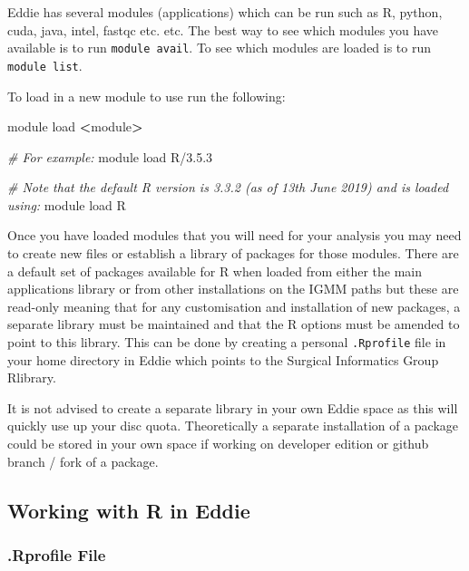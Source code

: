\documentclass[
]{book}
\newenvironment{Shaded}{\begin{snugshade}}{\end{snugshade}}
\newcommand{\CommentTok}[1]{\textcolor[rgb]{0.56,0.35,0.01}{\textit{#1}}}
\newcommand{\ExtensionTok}[1]{#1}
\newcommand{\NormalTok}[1]{#1}
\newcommand{\OperatorTok}[1]{\textcolor[rgb]{0.81,0.36,0.00}{\textbf{#1}}}
\begin{document}
Eddie has several modules (applications) which can be run such as R, python, cuda, java, intel, fastqc etc. etc. The best way to see which modules you have available is to run \texttt{module\ avail}. To see which modules are loaded is to run \texttt{module\ list}.

To load in a new module to use run the following:

\begin{Shaded}
\begin{Highlighting}[]
\ExtensionTok{module}\NormalTok{ load }\OperatorTok{\textless{}}\NormalTok{module}\OperatorTok{\textgreater{}}

\CommentTok{\# For example:}
\ExtensionTok{module}\NormalTok{ load R/3.5.3}

\CommentTok{\# Note that the default R version is 3.3.2 (as of 13th June 2019) and is loaded using:}
\ExtensionTok{module}\NormalTok{ load R}
\end{Highlighting}
\end{Shaded}

Once you have loaded modules that you will need for your analysis you may need to create new files or establish a library of packages for those modules. There are a default set of packages available for R when loaded from either the main applications library or from other installations on the IGMM paths but these are read-only meaning that for any customisation and installation of new packages, a separate library must be maintained and that the R options must be amended to point to this library. This can be done by creating a personal \texttt{.Rprofile} file in your home directory in Eddie which points to the Surgical Informatics Group Rlibrary.

It is not advised to create a separate library in your own Eddie space as this will quickly use up your disc quota. Theoretically a separate installation of a package could be stored in your own space if working on developer edition or github branch / fork of a package.

\hypertarget{working-with-r-in-eddie}{%
\subsection{Working with R in Eddie}\label{working-with-r-in-eddie}}

\hypertarget{rprofile-file}{%
\subsubsection{.Rprofile File}\label{rprofile-file}}
\end{document}
